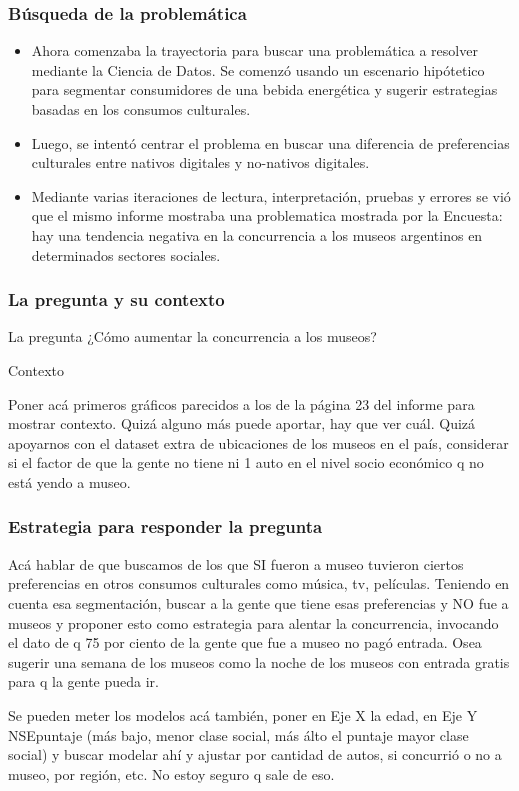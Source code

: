 \documentclass{beamer}
\begin{document}
\begin{frame}
\frametitle{Búsqueda de la problemática}

\begin{itemize}
\item<1-> Ahora comenzaba la trayectoria para buscar una problemática a resolver mediante la Ciencia de Datos. Se comenzó usando un escenario hipótetico para segmentar consumidores de una bebida energética y sugerir estrategias basadas en los consumos culturales.
\item<2-> Luego, se intentó centrar el problema en buscar una diferencia de preferencias culturales entre nativos digitales y no-nativos digitales.
\item<3-> Mediante varias iteraciones de lectura, interpretación, pruebas y errores se vió que el mismo informe mostraba una problematica mostrada por la Encuesta: hay una tendencia negativa en la concurrencia a los museos argentinos en determinados sectores sociales.
\end{itemize}

\end{frame}

\begin{frame}
\frametitle{La pregunta y su contexto}

\begin{block}{La pregunta}
¿Cómo aumentar la concurrencia a los museos?
\end{block}

\begin{block}{Contexto}

Poner acá primeros gráficos parecidos a los de la página 23 del informe para mostrar contexto. Quizá alguno más puede aportar, hay que ver cuál.
Quizá apoyarnos con el dataset extra de ubicaciones de los museos en el país, considerar si el factor de que la gente no tiene ni 1 auto en el nivel socio económico q no está yendo a museo.

\end{block}

\end{frame}

\begin{frame}
\frametitle{Estrategia para responder la pregunta}

Acá hablar de que buscamos de los que SI fueron a museo tuvieron ciertos preferencias en otros consumos culturales como música, tv, películas. 
Teniendo en cuenta esa segmentación, buscar a la gente que tiene esas preferencias y NO fue a museos y proponer esto como estrategia para alentar la concurrencia, invocando el dato de q 75 por ciento  de la gente que fue a museo no pagó entrada. 
Osea sugerir una semana de los museos como la noche de los museos con entrada gratis para q la gente pueda ir.

Se pueden meter los modelos acá también, poner en Eje X la edad, en Eje Y NSEpuntaje (más bajo, menor clase social, más álto el puntaje mayor clase social) y buscar modelar ahí y ajustar por cantidad de autos, si concurrió o no a museo, por región, etc. No estoy seguro q sale de eso.

\end{frame}
\end{document}
